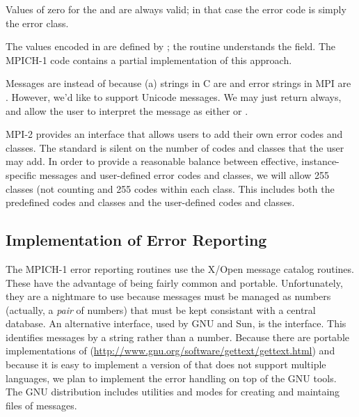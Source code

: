 \documentclass{article}
\begin{document}
Values of zero for the  and  are
always valid; in that case the error code is simply the error class.

The values encoded in  are defined by
; the routine 
understands the  field.  The MPICH-1 code contains a
partial implementation of this approach.

Messages are  instead of  because (a)
strings in C are  and error strings in MPI are .  However, we'd like to support Unicode messages.  We may just
return  always, and allow the user to interpret the
message as either  or .

MPI-2 provides an interface that allows users to add their own error
codes and classes.  The standard is silent on the number of codes and
classes that the user may add.  In order to provide a reasonable
balance between effective, instance-specific messages and user-defined
error codes and classes, we will allow 255 classes (not counting
 and 255
codes within each class.  This includes both the predefined codes and
classes and the user-defined codes and classes.



\subsection{Implementation of Error Reporting}
\label{sec:error-report-impl}
The MPICH-1 error reporting routines use the X/Open  message
catalog routines.  These have the advantage of being fairly common and
portable.  Unfortunately, they are a nightmare to use because messages must be
managed as numbers (actually, a \emph{pair} of numbers) that must be kept
consistant with a central database.  An 
alternative interface, used by GNU and Sun, is the  interface.
This identifies messages by a string rather than a number.
Because there are portable implementations of 
(\url{http://www.gnu.org/software/gettext/gettext.html}) and because it is
easy to implement a version of  that does not support multiple
languages, we plan to implement the error handling on top of the GNU
 tools.  The GNU  distribution includes utilities
and  modes for creating and maintaing files of messages.
\end{document}

